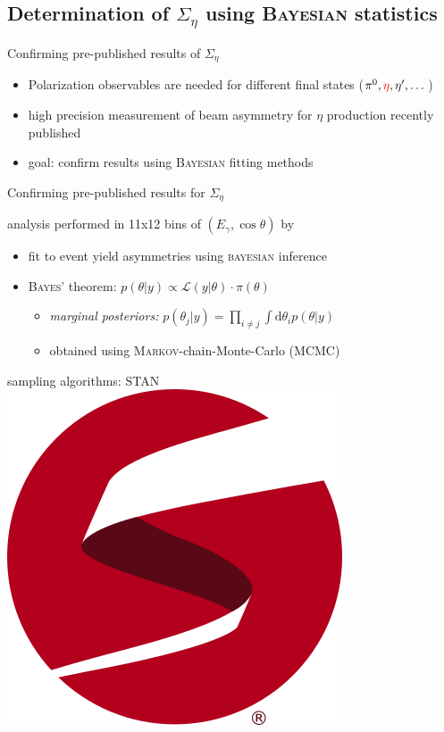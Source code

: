 \documentclass[11pt,aspectratio=169,dvipsnames]{beamer}
\newcommand{\thecolor}{black!70!blue}
\begin{document}
	\subsection{Determination of $\Sigma_\eta$ using \textsc{Bayesian} statistics}
		\begin{frame}{Confirming pre-published results of $\Sigma_\eta$}
		\begin{itemize}
			\item Polarization observables are needed for different final states ($\pi^0,{\color{red}\eta},\eta',\dots$)
			\item high precision measurement of beam asymmetry for $\eta$ production recently published {\cites{eta}}
			\item goal: confirm results using \textsc{Bayesian} fitting methods
		\end{itemize}
		
	\end{frame}
	\begin{frame}{Confirming pre-published results for $\Sigma_\eta$}
		
		\begin{minipage}{\linewidth}
			\begin{tcolorbox}[colback=blue!5,colframe=\thecolor,title={Event selection ($\eta$)}]
				analysis performed in 11x12 bins of $(E_\gamma,\cos\theta)$ by {\cites{eta}}
			\end{tcolorbox}
		\end{minipage}
		\begin{minipage}{\linewidth}
			\begin{tcolorbox}[colback=blue!5,colframe=\thecolor,title={Method}]
				\begin{itemize}
					\item fit to event yield asymmetries using \textsc{bayesian} inference
					\item \textsc{Bayes'} theorem: $p(\theta|y)\propto\mathcal{L}(y|\theta)\cdot\pi(\theta)$
					\begin{itemize}
						\item \emph{marginal posteriors:} $p(\theta_j|y)=\prod_{i\neq j}\int\text{d}\theta_i p(\theta|y)$
						\item obtained using \textsc{Markov}-chain-Monte-Carlo (MCMC)
						
					\end{itemize} 
				\end{itemize}
				\begin{flushright}
					sampling algorithms: STAN \includegraphics[width=.1\linewidth]{figs/logo-tm.png}\\
					\cites{stan}
				\end{flushright}
			\end{tcolorbox}
		\end{minipage}
	\end{frame}
\end{document}
